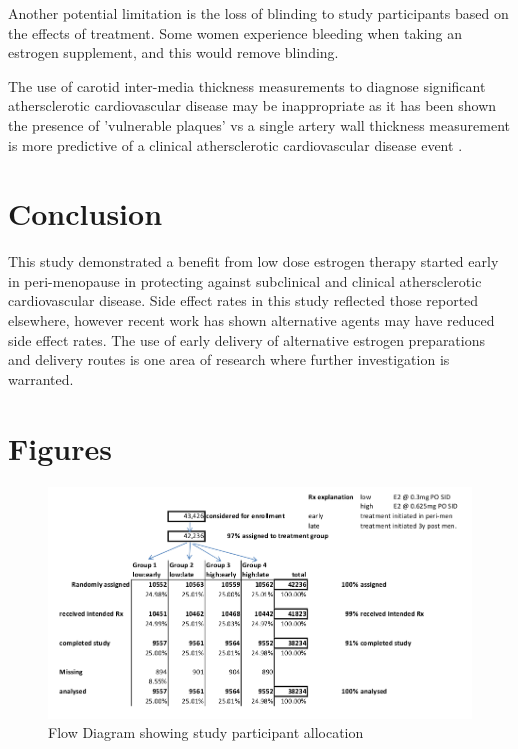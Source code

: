 \documentclass[11pt]{article}
\begin{document}
		Another potential limitation is the loss of blinding to study participants based on the effects of treatment. Some women experience bleeding when taking an estrogen supplement, and this would remove blinding.


		The use of carotid inter-media thickness measurements to diagnose significant athersclerotic cardiovascular disease may be inappropriate as it has been shown the presence of 'vulnerable plaques' vs a single artery wall thickness measurement is more predictive of a clinical athersclerotic cardiovascular disease event \cite{Maseri2003}.
		

	\section{Conclusion}
		This study demonstrated a benefit from low dose estrogen therapy started early in peri-menopause in protecting against subclinical and clinical athersclerotic cardiovascular disease.
		Side effect rates in this study reflected those reported elsewhere, however recent work has shown alternative agents may have reduced side effect rates.
		The use of early delivery of alternative estrogen preparations and delivery routes is one area of research where further investigation is warranted.


	\section{Figures}

\begin{figure}[h!]
	\centering
	\includegraphics[scale=0.5]{figure1.jpg}
	\caption{Flow Diagram showing study participant allocation}
	\label{flow}
\end{figure}
\end{document}

